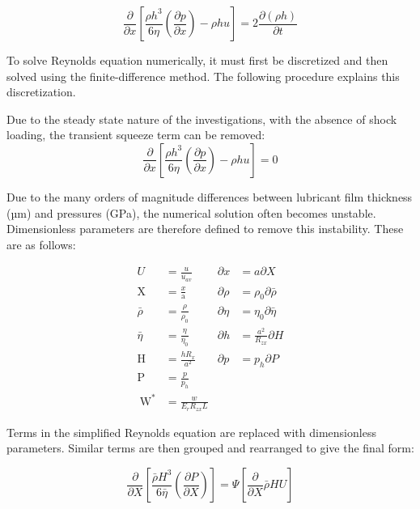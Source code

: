 \begin{equation}\label{eq3.1}
	\frac{\partial}{\partial x}\left[\frac{\rho h^{3}}{6 \eta}\left(\frac{\partial p}{\partial x}\right)-\rho h u\right]=2 \frac{\partial(\rho h)}{\partial t}
\end{equation}

To solve Reynolds equation numerically, it must first be discretized and then solved using the finite-difference method. The following procedure explains this discretization.

Due to the steady state nature of the investigations, with the absence of shock loading, the transient squeeze term can be removed:
\begin{equation}\label{eq3.2}
	\frac{\partial}{\partial x}\left[\frac{\rho h^{3}}{6 \eta}\left(\frac{\partial p}{\partial x}\right)-\rho h u\right]=0
\end{equation}

Due to the many orders of magnitude differences between lubricant film thickness (µm) and pressures (GPa), the numerical solution often becomes unstable. Dimensionless parameters are therefore defined to remove this instability. These are as follows:

\begin{equation}\label{eq3.3}
	\begin{aligned}
		U &=\frac{u}{u_{a v}} & \partial x &=a \partial X \\
		\mathrm{X} &=\frac{x}{\mathrm{a}} & \partial \rho &=\rho_{0} \partial \bar{\rho} \\
		\bar{\rho} &=\frac{\rho}{\rho_{0}} & \partial \eta &=\eta_{0} \partial \bar{\eta} \\
		\bar{\eta} &=\frac{\eta}{\eta_{0}} & \partial h &=\frac{a^{2}}{R_{z x}} \partial H \\
		\mathrm{H} &=\frac{h R_{x}}{a^{2}} & \partial p &=p_{h} \partial P \\
		\mathrm{P} &=\frac{p}{p_{h}} & \\
		\mathrm{~W}^{*} &=\frac{w}{E_{r} R_{z x} L} &
	\end{aligned}
\end{equation}

Terms in the simplified Reynolds equation are replaced with dimensionless parameters. Similar terms are then grouped and rearranged to give the final form:

\begin{equation}\label{eq3.4}
	\frac{\partial}{\partial X}\left[\frac{\bar{\rho} H^{3}}{6 \bar{\eta}}\left(\frac{\partial P}{\partial X}\right)\right]=\Psi\left[\frac{\partial}{\partial X} \bar{\rho} H U\right]
\end{equation}

